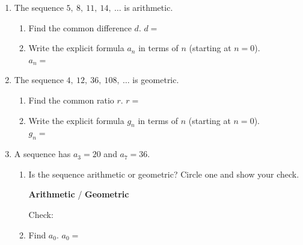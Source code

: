 \documentclass[10pt]{article}
\begin{document}
\namedateperiod

\vspace{0.14in}

\begin{enumerate}[itemsep=18pt]

\item The sequence $5,\ 8,\ 11,\ 14,\ \ldots$ is arithmetic.

      \begin{enumerate}[label=(\alph*), itemsep=8pt]
        \item Find the common difference $d$. \quad $d = $ \blank{3cm}

        \item Write the explicit formula $a_n$ in terms of $n$ (starting at $n = 0$). \\[4pt]
              $a_n = $ \blank{6cm}
      \end{enumerate}

\item The sequence $4,\ 12,\ 36,\ 108,\ \ldots$ is geometric.

      \begin{enumerate}[label=(\alph*), itemsep=8pt]
        \item Find the common ratio $r$. \quad $r = $ \blank{3cm}

        \item Write the explicit formula $g_n$ in terms of $n$ (starting at $n = 0$). \\[4pt]
              $g_n = $ \blank{6cm}
      \end{enumerate}

\item A sequence has $a_3 = 20$ and $a_7 = 36$.

      \begin{enumerate}[label=(\alph*), itemsep=8pt]
        \item Is the sequence arithmetic or geometric? Circle one and show your check.

              \medskip
              \textbf{Arithmetic} \quad / \quad \textbf{Geometric}

              \vspace{0.08in}
              Check: \blank{8cm}

        \item Find $a_0$. \quad $a_0 = $ \blank{3cm}
      \end{enumerate}

\end{enumerate}
\end{document}
